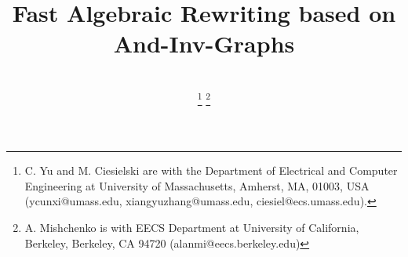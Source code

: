 \documentclass[journal]{IEEEtran}
\begin{document}

\title{Fast Algebraic Rewriting based on And-Inv-Graphs}


%
%

\author{\\
\thanks{C. Yu and M. Ciesielski are with the Department of Electrical and Computer Engineering at University of Massachusetts, Amherst, MA, 01003, USA (ycunxi@umass.edu, xiangyuzhang@umass.edu, ciesiel@ecs.umass.edu).}
\thanks{A. Mishchenko is with EECS Department at University of California, Berkeley, Berkeley, CA 94720 (alanmi@eecs.berkeley.edu)}
}



%
%


\maketitle
\end{document}
